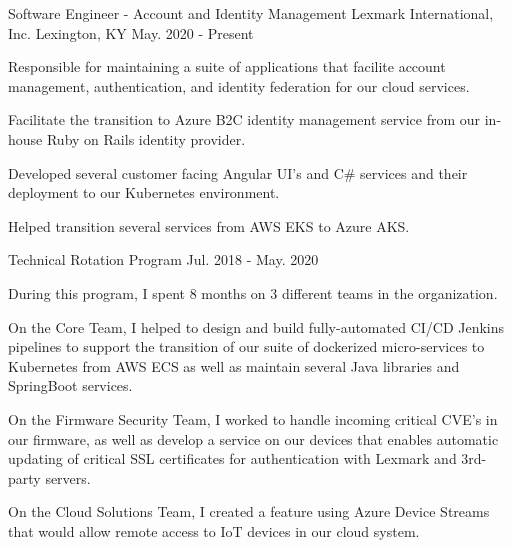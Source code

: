 

\begin{cventries}

  \cventry
    {Software Engineer - Account and Identity Management} %
    {Lexmark International, Inc.} %
    {Lexington, KY} %
    {May. 2020 - Present} %
    {
      \begin{cvitems} %
        \item {Responsible for maintaining a suite of applications that facilite account management, authentication, and identity federation for our cloud services.}
        \item {Facilitate the transition to Azure B2C identity management service from our in-house Ruby on Rails identity provider.}
        \item {Developed several customer facing Angular UI's and C\# services and their deployment to our Kubernetes environment.}
        \item {Helped transition several services from AWS EKS to Azure AKS.}
      \end{cvitems}
    }

  \cventry
    {Technical Rotation Program} %
    { } %
    { } %
    {Jul. 2018 - May. 2020} %
    {
      \begin{cvitems} %
        \item {During this program, I spent 8 months on 3 different teams in the organization.}
        \item {On the Core Team, I helped to design and build fully-automated CI/CD Jenkins pipelines to support the transition of our suite of dockerized micro-services to Kubernetes from AWS ECS as well as maintain several Java libraries and SpringBoot services.}
        \item {On the Firmware Security Team, I worked to handle incoming critical CVE's in our firmware, as well as develop a service on our devices that enables automatic updating of critical SSL certificates for authentication with Lexmark and 3rd-party servers.}
        \item {On the Cloud Solutions Team, I created a feature using Azure Device Streams that would allow remote access to IoT devices in our cloud system.}
      \end{cvitems}
    }


\end{cventries}

